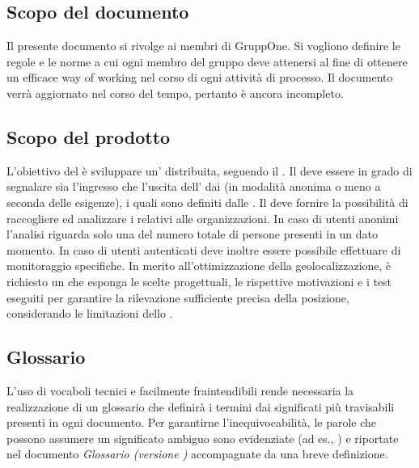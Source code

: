 \documentclass[../norme-di-progetto.tex]{subfiles}
\begin{document}
\subsection{Scopo del documento}%
\label{sub:scopo_del_documento}

Il presente documento si rivolge ai membri di GruppOne.
Si vogliono definire le regole e le norme a cui ogni membro del gruppo deve attenersi al fine di ottenere un efficace way of working nel corso di ogni attività di processo.
Il documento verrà aggiornato nel corso del tempo, pertanto è ancora incompleto.

\subsection{Scopo del prodotto}%
\label{sub:scopo_del_prodotto}
L'obiettivo del  è sviluppare un' distribuita, seguendo il .
Il  deve essere in grado di segnalare sia l'ingresso che l'uscita dell' dai  (in modalità anonima o meno a seconda delle esigenze), i quali sono definiti dalle .
Il  deve fornire la possibilità di raccogliere ed analizzare i  relativi alle organizzazioni.
In caso di utenti anonimi l'analisi riguarda solo una  del numero totale di persone presenti in un dato momento.
In caso di utenti autenticati deve inoltre essere possibile effettuare  di monitoraggio specifiche.
In merito all'ottimizzazione della geolocalizzazione, è richiesto un  che esponga le scelte progettuali, le rispettive motivazioni e i test eseguiti per garantire la rilevazione sufficiente precisa della posizione, considerando le limitazioni dello .


\subsection{Glossario}%
\label{sub:glossario}

L'uso di vocaboli tecnici e facilmente fraintendibili rende necessaria la realizzazione di un glossario che definirà i termini dai significati più travisabili presenti in ogni documento.
Per garantirne l'inequivocabilità, le parole che possono assumere un significato ambiguo sono evidenziate (ad es., ) e riportate nel documento \textit{Glossario (versione \versione)} accompagnate da una breve definizione.
\end{document}
